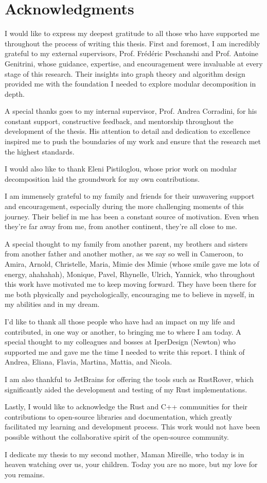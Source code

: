 

\chapter*{Acknowledgments}\label{ch:acknowledgments}

I would like to express my deepest gratitude to all those who have supported me throughout the process of writing this thesis.
First and foremost, I am incredibly grateful to my external supervisors, Prof. Frédéric Peschanshi and Prof. Antoine Genitrini, whose guidance, expertise, and encouragement were invaluable at every stage of this research.
Their insights into graph theory and algorithm design provided me with the foundation I needed to explore modular decomposition in depth.

A special thanks goes to my internal supervisor, Prof. Andrea Corradini, for his constant support, constructive feedback, and mentorship throughout the development of the thesis.
His attention to detail and dedication to excellence inspired me to push the boundaries of my work and ensure that the research met the highest standards.

I would also like to thank Eleni Pistiloglou, whose prior work on modular decomposition laid the groundwork for my own contributions.

I am immensely grateful to my family and friends for their unwavering support and encouragement, especially during the more challenging moments of this journey.
Their belief in me has been a constant source of motivation.
Even when they're far away from me, from another continent, they're all close to me.

A special thought to my family from another parent, my brothers and sisters from another father and another mother, as we say so well in Cameroon, to Amira, Arnold, Christelle, Maria, Mimie des Mimie (whose smile gave me lots of energy, ahahahah), Monique, Pavel, Rhynelle, Ulrich, Yannick, who throughout this work have motivated me to keep moving forward.
They have been there for me both physically and psychologically, encouraging me to believe in myself, in my abilities and in my dream.

I'd like to thank all those people who have had an impact on my life and contributed, in one way or another, to bringing me to where I am today.
A special thought to my colleagues and bosses at IperDesign (Newton) who supported me and gave me the time I needed to write this report.
I think of Andrea, Eliana, Flavia, Martina, Mattia, and Nicola.

I am also thankful to JetBrains for offering the tools such as RustRover, which significantly aided the development and testing of my Rust implementations.

Lastly, I would like to acknowledge the Rust and C++ communities for their contributions to open-source libraries and documentation, which greatly facilitated my learning and development process.
This work would not have been possible without the collaborative spirit of the open-source community.

I dedicate my thesis to my second mother, Maman Mireille, who today is in heaven watching over us, your children.
Today you are no more, but my love for you remains.


